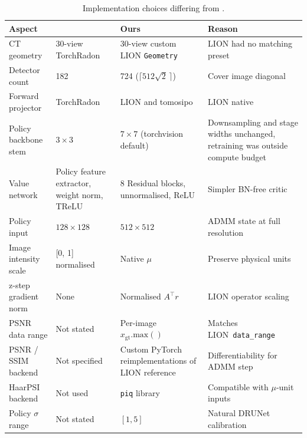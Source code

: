 \begin{table}[H]
    \centering
    \footnotesize
    \caption{Implementation choices differing from \citet{Wei2022TFPnP}.}
    \label{tab:implementation-differences}
    \begin{tabular}{L{3cm}L{3cm}L{3cm}L{4.5cm}}
        \toprule
        Aspect                & \citet{Wei2022TFPnP} & Ours & Reason \\
        \midrule
        CT geometry            & 30-view TorchRadon        & 30-view custom LION \texttt{Geometry}  & LION had no matching preset \\ \hline
        Detector count         & 182                       & 724 ($\lceil 512\sqrt{2}\,\rceil$) & Cover image diagonal \\ \hline
        Forward projector      & TorchRadon                & LION and tomosipo & LION native \\ \hline
        Policy backbone stem   & $3\times3$                & $7\times7$ (torchvision default) & Downsampling and stage widths unchanged, retraining was outside compute budget \\ \hline
        Value network          & Policy feature extractor, weight norm, TReLU & 8 Residual blocks, unnormalised, ReLU & Simpler BN-free critic \\ \hline
        Policy input          & $128\times128$           & $512\times512$ & ADMM state at full resolution \\ \hline
        Image intensity scale  & [0, 1] normalised         & Native $\mu$ & Preserve physical units \\ \hline
        z-step gradient norm   & None                      & Normalised $A^{\top}r$ & LION operator scaling \\ \hline
        PSNR data range        & Not stated                & Per-image $x_{\text{gt}}.\text{max}()$ & Matches LION~\texttt{data\_range} \\ \hline
        PSNR / SSIM backend    & Not specified             & Custom PyTorch reimplementations of LION reference & Differentiability for ADMM step \\ \hline
        HaarPSI backend        & Not used                  & \texttt{piq} library & Compatible with $\mu$-unit inputs \\ \hline
        Policy $\sigma$ range  & Not stated                & $[1, 5]$ & Natural DRUNet calibration\\ \hline

\end{tabular}
\end{table}

